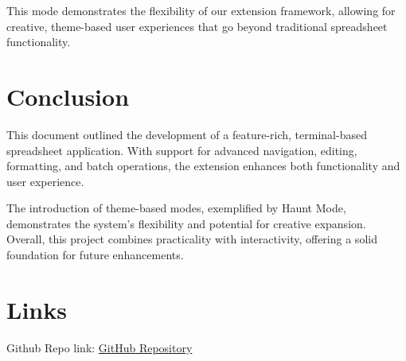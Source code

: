 \documentclass[a4paper,12pt]{article}
\begin{document}
This mode demonstrates the flexibility of our extension framework, allowing for creative, theme-based user experiences that go beyond traditional spreadsheet functionality.

\section{Conclusion}

This document outlined the development of a feature-rich, terminal-based spreadsheet application. With support for advanced navigation, editing, formatting, and batch operations, the extension enhances both functionality and user experience.

The introduction of theme-based modes, exemplified by Haunt Mode, demonstrates the system's flexibility and potential for creative expansion. Overall, this project combines practicality with interactivity, offering a solid foundation for future enhancements.

\section{Links}
Github Repo link: \href{https://github.com/PrishaBhoola/Rust_lab}{GitHub Repository}
\end{document}

